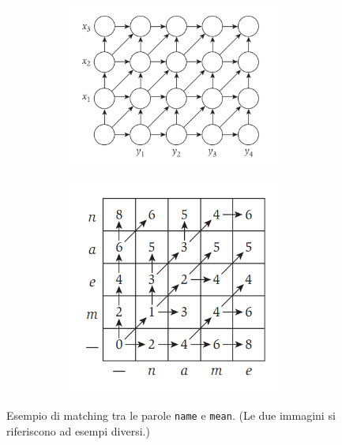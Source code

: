 \begin{figure}[H]
	\begin{subfigure}{\textwidth}
		\centering
		\begin{subfigure}{.5\textwidth}
			\centering
			\includegraphics[width=\linewidth, keepaspectratio]{capitoli/programmazione_dinamica/imgs/sa.png}
		\end{subfigure}%
		\begin{subfigure}{.5\textwidth}
			\centering
			\includegraphics[width=.8\linewidth, keepaspectratio]{capitoli/programmazione_dinamica/imgs/seqalignmatrix.png}
		\end{subfigure}%
	\end{subfigure}
	\caption{Esempio di matching tra le parole \texttt{name} e \texttt{mean}.
		(Le due immagini si riferiscono ad esempi diversi.)}
\end{figure}

